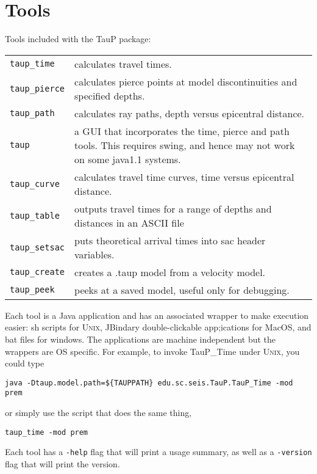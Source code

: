 
\section{Tools}

Tools included with the TauP package:

\begin{center}
\begin{tabular}{lp{3.2in}}

\texttt{taup\_time} & 
  calculates travel times. \\
\texttt{taup\_pierce} & 
  calculates pierce points at model discontinuities and specified depths. \\
\texttt{taup\_path} & calculates ray paths, depth versus epicentral distance. \\
\texttt{taup} & a GUI that incorporates the time, pierce and path tools. This
requires swing, and hence may not work on some java1.1 systems. \\
\texttt{taup\_curve} & 
  calculates travel time curves, time versus epicentral distance. \\
\texttt{taup\_table} & outputs travel times for a range of depths and distances in an ASCII file \\
\texttt{taup\_setsac} & 
  puts theoretical arrival times into sac header variables. \\
\texttt{taup\_create} & 
  creates a .taup model from a velocity model. \\
\texttt{taup\_peek} & peeks at a saved model, useful only for debugging. \\
\end{tabular}
\end{center}

Each tool is a Java application and has an associated wrapper to make
execution easier: sh scripts 
for \textsc{Unix}, JBindary double-clickable app;ications for MacOS, and
bat files for windows.  The applications are machine independent but the 
wrappers are OS specific. 
For example, to invoke TauP\_Time under \textsc{Unix}, you could type

\texttt{java -Dtaup.model.path=\$\{TAUPPATH\} edu.sc.seis.TauP.TauP\_Time -mod prem}

or simply use the script that does the same thing,

\texttt{taup\_time -mod prem}

Each tool has a \texttt{-help} flag that will print a usage summary, as well
as a \texttt{-version} flag that will print the version.

